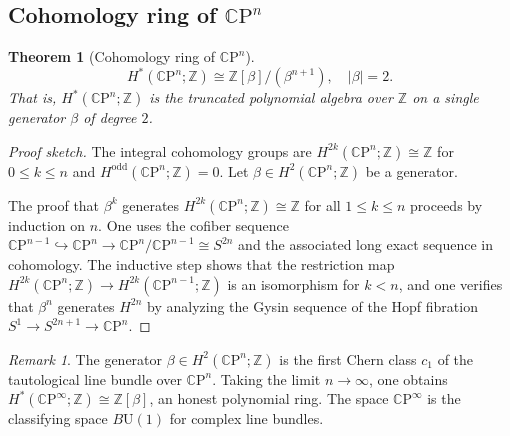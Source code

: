 \documentclass[12pt,a4paper,openany]{book}
\theoremstyle{definition}
\theoremstyle{plain}
\newtheorem{theorem}[definition]{Theorem}
\theoremstyle{remark}
\newtheorem{remark}[definition]{Remark}
\newcommand{\Z}{\mathbb{Z}}
\newcommand{\CP}{\mathbb{C}\mathrm{P}}
\newcommand{\abs}[1]{\left|#1\right|}
\begin{document}
\subsection{Cohomology ring of $\CP^n$}
\label{subsec:coh-cpn}

\begin{theorem}[Cohomology ring of $\CP^n$]\label{thm:coh-ring-CPn}
\[
  H^*(\CP^n;\Z) \cong \Z[\beta]/(\beta^{n+1}),
  \quad \abs{\beta}=2.
\]
That is, $H^*(\CP^n;\Z)$ is the truncated polynomial algebra over $\Z$
on a single generator $\beta$ of degree $2$.
\end{theorem}

\begin{proof}[Proof sketch]
The integral cohomology groups are $H^{2k}(\CP^n;\Z)\cong\Z$ for
$0\leq k\leq n$ and $H^{\text{odd}}(\CP^n;\Z)=0$. Let
$\beta\in H^2(\CP^n;\Z)$ be a generator.

The proof that $\beta^k$ generates $H^{2k}(\CP^n;\Z)\cong\Z$ for all
$1\leq k\leq n$ proceeds by induction on $n$. One uses the cofiber
sequence $\CP^{n-1}\hookrightarrow\CP^n\to\CP^n/\CP^{n-1}\cong S^{2n}$
and the associated long exact sequence in cohomology. The inductive
step shows that the restriction map
$H^{2k}(\CP^n;\Z)\to H^{2k}(\CP^{n-1};\Z)$ is an isomorphism for
$k<n$, and one verifies that $\beta^n$ generates $H^{2n}$ by analyzing
the Gysin sequence of the Hopf fibration $S^1\to S^{2n+1}\to\CP^n$.
\end{proof}

\begin{remark}
The generator $\beta\in H^2(\CP^n;\Z)$ is the first Chern class $c_1$
of the tautological line bundle over $\CP^n$. Taking the limit
$n\to\infty$, one obtains $H^*(\CP^\infty;\Z)\cong\Z[\beta]$,
an honest polynomial ring. The space $\CP^\infty$ is the classifying
space $B\mathrm{U}(1)$ for complex line bundles.
\end{remark}
\end{document}
